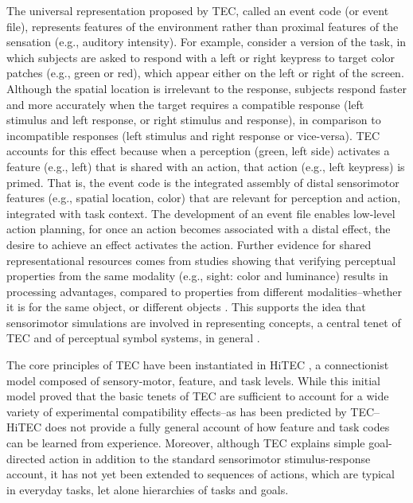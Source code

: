 \documentclass[10pt,letterpaper]{article}
\numberwithin{equation}{section}
\begin{document}
The universal representation proposed by TEC, called an event code (or event file), represents features of the environment rather than proximal features of the sensation (e.g., auditory intensity). For example, consider a version of the  task, in which subjects are asked to respond with a left or right keypress to target color patches (e.g., green or red), which appear either on the left or right of the screen. Although the spatial location is irrelevant to the response, subjects respond faster and more accurately when the target requires a compatible response (left stimulus and left response, or right stimulus and response), in comparison to incompatible responses (left stimulus and right response or vice-versa). TEC accounts for this effect because when a perception (green, left side) activates a feature (e.g., left) that is shared with an action, that action (e.g., left keypress) is primed. That is, the event code is the integrated assembly of distal sensorimotor features (e.g., spatial location, color) that are relevant for perception and action, integrated with task context. The development of an event file enables low-level action planning, for once an action becomes associated with a distal effect, the desire to achieve an effect activates the action. Further evidence for shared representational resources comes from studies showing that verifying perceptual properties from the same modality (e.g., sight: color and luminance) results in processing advantages, compared to properties from different modalities--whether it is for the same object, or different objects \cite{Pecher:2003,Pecher:2004}. This supports the idea that sensorimotor simulations are involved in representing concepts, a central tenet of TEC and of perceptual symbol systems, in general \cite{Barsalou:1999}.


The core principles of TEC have been instantiated in HiTEC \cite{Haazebroek:2011}, a connectionist model composed of sensory-motor, feature, and task levels. While this initial model proved that the basic tenets of TEC are sufficient to account for a wide variety of experimental compatibility effects--as has been predicted by TEC--HiTEC does not provide a fully general account of how feature and task codes can be learned from experience. Moreover, although TEC explains simple goal-directed action in addition to the standard sensorimotor stimulus-response account, it has not yet been extended to sequences of actions, which are typical in everyday tasks, let alone hierarchies of tasks and goals.
\end{document}
